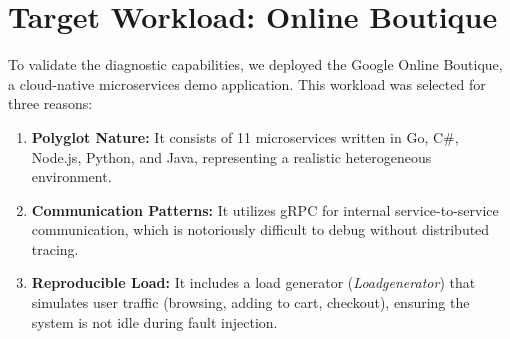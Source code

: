 \section{Target Workload: Online Boutique}
\label{sec:workload}

To validate the diagnostic capabilities, we deployed the Google Online Boutique, a cloud-native microservices demo application. This workload was selected for three reasons:
\begin{enumerate}
    \item \textbf{Polyglot Nature:} It consists of 11 microservices written in Go, C\#, Node.js, Python, and Java, representing a realistic heterogeneous environment.
    \item \textbf{Communication Patterns:} It utilizes gRPC for internal service-to-service communication, which is notoriously difficult to debug without distributed tracing.
    \item \textbf{Reproducible Load:} It includes a load generator (\textit{Loadgenerator}) that simulates user traffic (browsing, adding to cart, checkout), ensuring the system is not idle during fault injection.
\end{enumerate}